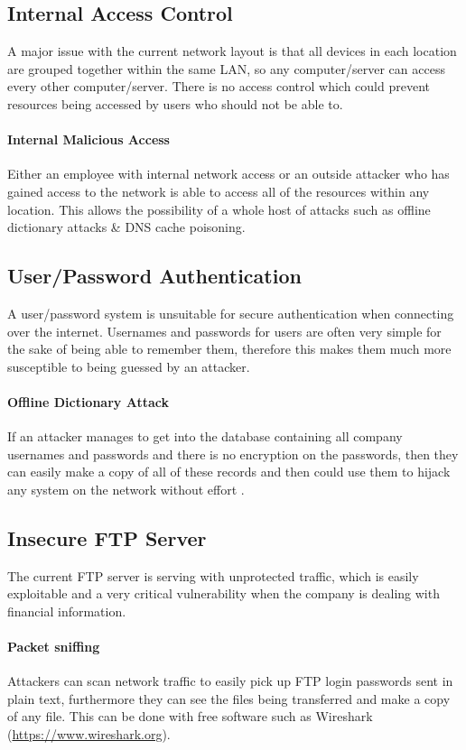 \documentclass[11pt]{article}
\begin{document}
    \subsection{Internal Access Control}
      A major issue with the current network layout is that all devices in each location are grouped together within the same LAN, so any computer/server can access every other computer/server. There is no access control which could prevent resources being accessed by users who should not be able to.

      \paragraph{Internal Malicious Access}
        Either an employee with internal network access or an outside attacker who has gained access to the network is able to access all of the resources within any location. This allows the possibility of a whole host of attacks such as offline dictionary attacks \& DNS cache poisoning.

    \subsection{User/Password Authentication}
      A user/password system is unsuitable for secure authentication when connecting over the internet. Usernames and passwords for users are often very simple for the sake of being able to remember them, therefore this makes them much more susceptible to being guessed by an attacker.

      \paragraph{Offline Dictionary Attack}
        If an attacker manages to get into the database containing all company usernames and passwords and there is no encryption on the passwords, then they can easily make a copy of all of these records and then could use them to hijack any system on the network without effort \citep{capecDictionary}.

    \subsection{Insecure FTP Server}
      The current FTP server is serving with unprotected traffic, which is easily exploitable and a very critical vulnerability when the company is dealing with financial information.

      \paragraph{Packet sniffing}
        Attackers can scan network traffic to easily pick up FTP login passwords sent in plain text, furthermore they can see the files being transferred and make a copy of any file. This can be done with free software such as Wireshark (\url{https://www.wireshark.org}).
\end{document}
